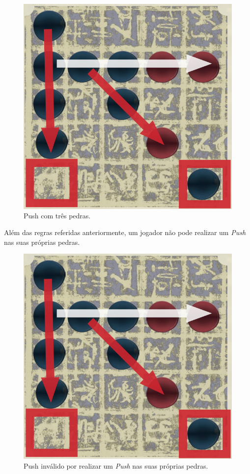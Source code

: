 \documentclass[a4paper]{article}
\begin{document}
\begin{figure}[!htb]
	\centering
	\includegraphics[scale=0.3]{push2.png}
	\caption{Push com três pedras.}
\end{figure}

Além das regras referidas anteriormente, um jogador não pode realizar um  \textit{Push} nas suas próprias pedras.

\begin{figure}[!htb]
	\centering
	\includegraphics[scale=0.3]{push2.png} 
	\caption{Push inválido por realizar um \textit{Push} nas suas próprias pedras.}
\end{figure}
\end{document}
